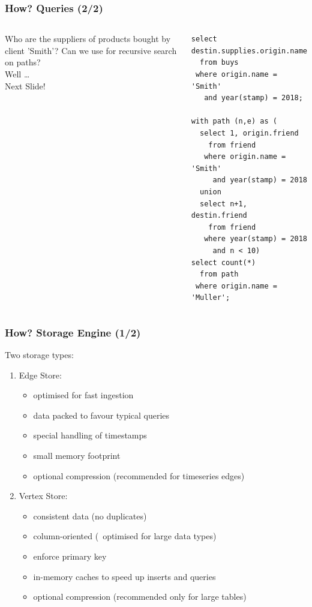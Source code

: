 \documentclass[mathserif]{beamer}
\begin{document}
\begin{frame}[fragile]
\frametitle{How? Queries (2/2)}
\begin{columns}[T]
\vskip0.3cm
{\small Who are the suppliers of products bought by client 'Smith'?}
\vskip0.7cm
{\small Can we use  for recursive search on paths?}\\
{\small Well \dots}\\
{\small Next Slide!}
\begin{sqlcode}
\begin{lstlisting}
select destin.supplies.origin.name
  from buys
 where origin.name = 'Smith'
   and year(stamp) = 2018;

with path (n,e) as (
  select 1, origin.friend
    from friend
   where origin.name = 'Smith' 
     and year(stamp) = 2018
  union
  select n+1, destin.friend
    from friend
   where year(stamp) = 2018
     and n < 10)
select count(*)
  from path
 where origin.name = 'Muller';
\end{lstlisting}
\end{sqlcode}
\end{columns}
\end{frame}

\begin{frame}
\frametitle{How? Storage Engine (1/2)}
Two storage types:
\begin{enumerate}
\item Edge Store:
      \begin{itemize}
      \item optimised for fast ingestion
      \item data packed to favour typical queries
      \item special handling of timestamps
      \item small memory footprint
      \item optional compression
            (recommended for timeseries edges)
      \end{itemize}
\item Vertex Store:
      \begin{itemize}
      \item consistent data (no duplicates)
      \item column-oriented
            (\ie\ optimised for large data types)
      \item enforce primary key
      \item in-memory caches to speed up
            inserts and queries
      \item optional compression
            (recommended only for large tables)
      \end{itemize}
\end{enumerate}
\end{frame}
\end{document}
